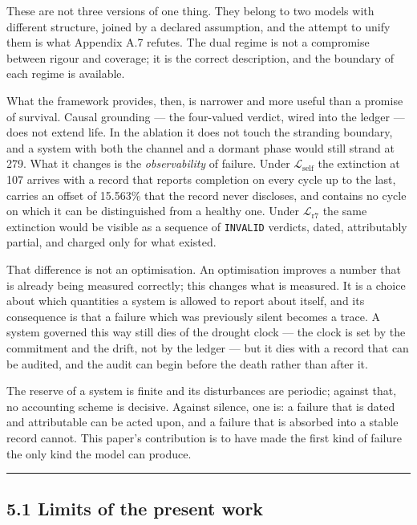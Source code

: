 \documentclass[11pt,a4paper]{article}
\begin{document}
These are not three versions of one thing. They belong to two models with different
structure, joined by a declared assumption, and the attempt to unify them is what
Appendix A.7 refutes. The dual regime is not a compromise between rigour and
coverage; it is the correct description, and the boundary of each regime is
available.

What the framework provides, then, is narrower and more useful than a promise of
survival. Causal grounding --- the four-valued verdict, wired into the ledger --- does
not extend life. In the ablation it does not touch the stranding boundary, and a
system with both the channel and a dormant phase would still strand at 279. What it
changes is the \emph{observability} of failure. Under \(\mathcal{L}_{\mathrm{self}}\) the
extinction at 107 arrives with a record that reports completion on every cycle up
to the last, carries an offset of 15.563\% that the record never discloses, and
contains no cycle on which it can be distinguished from a healthy one. Under
\(\mathcal{L}_{\mathrm{r7}}\) the same extinction would be visible as a sequence of
\texttt{INVALID} verdicts, dated, attributably partial, and charged only for what existed.

That difference is not an optimisation. An optimisation improves a number that is
already being measured correctly; this changes what is measured. It is a choice
about which quantities a system is allowed to report about itself, and its
consequence is that a failure which was previously silent becomes a trace. A
system governed this way still dies of the drought clock --- the clock is set by the
commitment and the drift, not by the ledger --- but it dies with a record that can be
audited, and the audit can begin before the death rather than after it.

The reserve of a system is finite and its disturbances are periodic; against that,
no accounting scheme is decisive. Against silence, one is: a failure that is dated
and attributable can be acted upon, and a failure that is absorbed into a stable
record cannot. This paper's contribution is to have made the first kind of failure
the only kind the model can produce.

\begin{center}\rule{0.5\linewidth}{0.5pt}\end{center}

\subsection{5.1 Limits of the present work}\label{limits-of-the-present-work}
\end{document}
